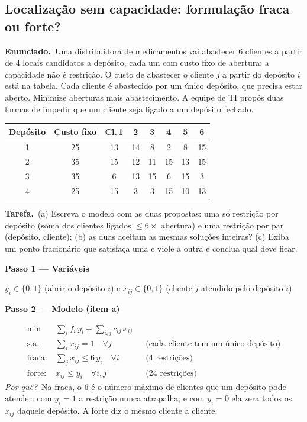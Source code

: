 \documentclass[11pt,a4paper]{article}
\newcommand{\enunciado}{\par\textbf{Enunciado.}\ }
\newcommand{\tarefa}{\par\textbf{Tarefa.}\ }
\newcommand{\passo}[1]{\par\medskip\textbf{#1}\par}
\newcommand{\porque}{\textit{Por quê?}\ }
\begin{document}
\subsection{Localização sem capacidade: formulação fraca ou forte?}
\enunciado Uma distribuidora de medicamentos vai abastecer 6 clientes a partir de 4 locais candidatos a
depósito, cada um com custo fixo de abertura; a capacidade não é restrição. O custo de abastecer o cliente $j$ a
partir do depósito $i$ está na tabela. Cada cliente é abastecido por um único depósito, que precisa estar aberto.
Minimize aberturas mais abastecimento. A equipe de TI propôs duas formas de impedir que um cliente seja
ligado a um depósito fechado.
\begin{center}
\begin{tabular}{cc|cccccc}
\toprule
Depósito & Custo fixo & Cl.\,1 & 2 & 3 & 4 & 5 & 6\\
\midrule
1 & 25 & 13 & 14 & 8 & 2 & 8 & 15\\
2 & 35 & 15 & 12 & 11 & 15 & 13 & 15\\
3 & 35 & 6 & 13 & 15 & 6 & 15 & 3\\
4 & 25 & 15 & 3 & 3 & 15 & 10 & 13\\
\bottomrule
\end{tabular}
\end{center}
\tarefa (a) Escreva o modelo com as duas propostas: uma só restrição por depósito (soma dos clientes
ligados $\le 6\times$ abertura) e uma restrição por par (depósito, cliente); (b) as duas aceitam as mesmas
soluções inteiras? (c) Exiba um ponto fracionário que satisfaça uma e viole a outra e conclua qual deve ficar.

\passo{Passo 1 --- Variáveis}
$y_i\in\{0,1\}$ (abrir o depósito $i$) e $x_{ij}\in\{0,1\}$ (cliente $j$ atendido pelo depósito $i$).

\passo{Passo 2 --- Modelo (item a)}
\begin{align*}
  \min\ & \sum_i f_i\,y_i + \sum_{i,j} c_{ij}\,x_{ij}\\
  \text{s.a.}\ & \sum_i x_{ij} = 1 \quad \forall j && \text{(cada cliente tem um único depósito)}\\
  \text{fraca:}\ & \sum_j x_{ij} \le 6\,y_i \quad \forall i && \text{(4 restrições)}\\
  \text{forte:}\ & x_{ij} \le y_i \quad \forall i,j && \text{(24 restrições)}
\end{align*}
\porque Na fraca, o 6 é o número máximo de clientes que um depósito pode atender: com $y_i=1$ a restrição
nunca atrapalha, e com $y_i=0$ ela zera todos os $x_{ij}$ daquele depósito. A forte diz o mesmo cliente a cliente.
\end{document}
